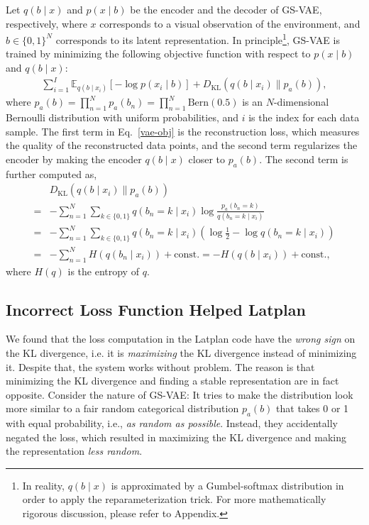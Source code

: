 Let $q(b \mid x)$ and $p(x \mid b)$ be the encoder and the decoder of GS-VAE, respectively,
where $x$ corresponds to a visual observation of the environment, and $b\in\{0,1\}^N$ corresponds to its latent representation.
In principle\footnote{In reality, $q(b\mid x)$ is approximated by a Gumbel-softmax distribution in order to apply the reparameterization trick. For more mathematically rigorous discussion, please refer to Appendix.}, GS-VAE is trained by minimizing the following objective function with respect to $p(x \mid b)$ and $q(b\mid x)$:
\begin{align}
\label{vae-obj} \sum_{i=1}^I \mathbb{E}_{q(b\mid x_i)}\left[-\log p(x_i\mid b)\right] + D_{\mathrm{KL}}(q(b\mid x_i) \parallel p_a(b)),
\end{align}
where $p_a(b) = \prod_{n=1}^N p_a(b_n) = \prod_{n=1}^N \mathrm{Bern}(0.5)$ is an $N$-dimensional Bernoulli distribution with uniform probabilities, and $i$ is the index for each data sample.
The first term in Eq.~\eqref{vae-obj} is the reconstruction loss, which measures the quality of the reconstructed data points,
and the second term regularizes the encoder by making the encoder $q(b\mid x)$ closer to $p_a(b)$.
The second term is further computed as,
\begin{align*}
 &D_{\mathrm{KL}}(q(b\mid x_i) \parallel p_a(b)) \\
= & - \sum_{n=1}^N \sum_{k\in\{0,1\}}q(b_{n}=k \mid x_i) \log\frac{p_a(b_{n}=k)}{q(b_{n}=k \mid x_i)}\\
=& - \sum_{n=1}^N \sum_{k\in\{0,1\}}q(b_{n}=k \mid x_i) \left(\log \frac{1}{2} - \log{q(b_{n}=k \mid x_i)}\right)\\
=& - \sum_{n=1}^N H(q(b_n\mid x_i)) + \mathrm{const.} = -H(q(b \mid x_i)) + \mathrm{const.},
\end{align*}
where $H(q)$ is the entropy of $q$.

\subsection{Incorrect Loss Function Helped Latplan}

We found that the loss computation in the Latplan code have the \emph{wrong sign} on the KL divergence,
i.e. it is \emph{maximizing} the KL divergence instead of minimizing it.
Despite that, the system works without problem.
% 
The reason is that minimizing the KL divergence and finding a stable representation are in fact opposite.
Consider the nature of GS-VAE:
It tries to make the distribution look more similar to a fair random categorical distribution $p_a(b)$
that takes 0 or 1 with equal probability, i.e., \emph{as random as possible}.
Instead, they accidentally negated the loss, which resulted in
maximizing the KL divergence and making the representation \emph{less random}.

